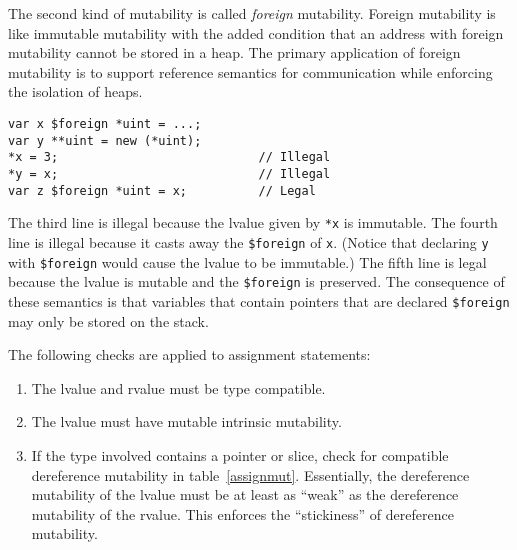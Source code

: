 The second kind of mutability is called \emph{foreign} mutability.
Foreign mutability is like immutable mutability with the added condition that an address with foreign mutability cannot be stored in a heap.
The primary application of foreign mutability is to support reference semantics for communication while enforcing the isolation of heaps.
\begin{verbatim}
var x $foreign *uint = ...;
var y **uint = new (*uint);
*x = 3;                            // Illegal
*y = x;                            // Illegal
var z $foreign *uint = x;          // Legal
\end{verbatim}
The third line is illegal because the lvalue given by \verb+*x+ is immutable.
The fourth line is illegal because it casts away the \verb|$foreign| of \verb+x+.
(Notice that declaring \verb+y+ with \verb|$foreign| would cause the lvalue to be immutable.)
The fifth line is legal because the lvalue is mutable and the \verb|$foreign| is preserved.
The consequence of these semantics is that variables that contain pointers that are declared \verb|$foreign| may only be stored on the stack.


The following checks are applied to assignment statements:
\begin{enumerate}
\item The lvalue and rvalue must be type compatible.
\item The lvalue must have mutable intrinsic mutability.
\item If the type involved contains a pointer or slice, check for compatible dereference mutability in table~\ref{assignmut}.
  Essentially, the dereference mutability of the lvalue must be at least as ``weak'' as the dereference mutability of the rvalue.
  This enforces the ``stickiness'' of dereference mutability.
\end{enumerate}

